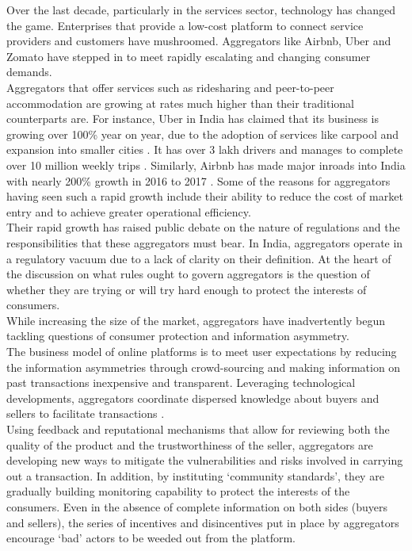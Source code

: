 \documentclass[a4paper, 12pt]{article}
\begin{document}
                   Over the last decade, particularly in the services sector, technology has changed the game. Enterprises that provide a low-cost platform to connect service providers and customers have mushroomed. Aggregators like Airbnb, Uber and Zomato have stepped in to meet rapidly escalating and changing consumer demands. \\
                   
                   Aggregators that offer services such as ridesharing and peer-to-peer accommodation are growing at rates much higher than their traditional counterparts are. For instance, Uber in India has claimed that its business is growing over 100\% year on year, due to the adoption of services like carpool and expansion into smaller cities \parencite{PTI2017}. It has over 3 lakh drivers and manages to complete over 10 million weekly trips \parencite{PTI2018}. Similarly, Airbnb has made major inroads into India with nearly 200\% growth in 2016 to 2017 \parencite{LaghateG}. Some of the reasons for aggregators having seen such a rapid growth include their ability to reduce the cost of market entry and to achieve greater operational efficiency. \\ 
                    
                  Their rapid growth has raised public debate on the nature of regulations and the responsibilities that these aggregators must bear. In India, aggregators operate in a regulatory vacuum due to a lack of clarity on their definition. At the heart of the discussion on what rules ought to govern aggregators is the question of whether they are trying or will try hard enough to protect the interests of consumers.\\

                   While increasing the size of the market, aggregators have inadvertently begun tackling questions of consumer protection and information asymmetry.\\
                     
                     The business model of online platforms is to meet user expectations by reducing the information asymmetries through crowd-sourcing and making information on past transactions inexpensive and transparent. Leveraging technological developments, aggregators coordinate dispersed knowledge about buyers and sellers to facilitate transactions \parencite{thierer2015internet}. \\
                    
                    Using feedback and reputational mechanisms that allow for reviewing both the quality of the product and the trustworthiness of the seller, aggregators are developing new ways to mitigate the vulnerabilities and risks involved in carrying out a transaction. In addition, by instituting ‘community standards’, they are gradually building monitoring capability to protect the interests of the consumers. Even in the absence of complete information on both sides (buyers and sellers), the series of incentives and disincentives put in place by aggregators encourage ‘bad’ actors to be weeded out from the platform. \\
                    
\end{document}
